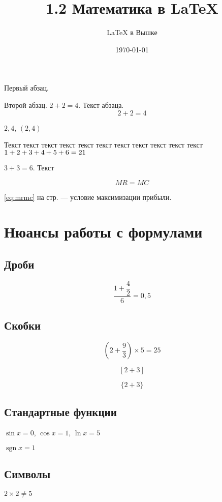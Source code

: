 \documentclass[a4paper,12pt]{article} %
\author{\LaTeX{} в Вышке}
\title{1.2 Математика в \LaTeX}
\date{\today}
\DeclareMathOperator{\sgn}{\mathop{sgn}}
\newcommand*{\hm}[1]{#1\nobreak\discretionary{}
	{\hbox{$\mathsurround=0pt #1$}}{}}
\begin{document}
	
	\maketitle
	
	Первый         абзац.
	
	Второй абзац.
	$2 +    2 =   4   $. Текст абзаца.
	\[  2+2=4  \]
	
	$2,4$, $(2, 4)$
	
	Текст текст текст текст текст текст текст текст текст текст текст $1\hm{+}2+3+4+5+6=21$
	
	$3+ 3 =6 $. Текст
	
	\begin{equation}\label{eq:mrmc}
		MR=MC
	\end{equation}
	
	
	\eqref{eq:mrmc}  на стр. \pageref{eq:mrmc} --- условие максимизации прибыли.
	
	
	\section{Нюансы работы с формулами}
	
	\subsection{Дроби}
	
	\[\frac{1+\dfrac{4}{2}}{6} = 0,5\]
	
	\subsection{Скобки}
	
	\[ \left(2+\frac{9}{3}\right) \times 5 = 25 \]
	
	\[  [2+3]  \]
	
	\[ \{2+3\}  \]
	
	\subsection{Стандартные функции}
	
	$\sin x = 0$, $\cos x = 1$, $\ln x = 5$
	
	$\sgn  x = 1$
	
	\subsection{Символы}
	
	$2\times 2 \ne 5$
	
\end{document}
